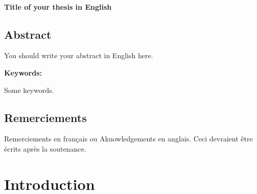 \documentclass[12pt]{LHSV_thesis}
\begin{document}
\begin{center}
~\vspace{6.0cm}\\
\thispagestyle{plain}
\Huge \textbf{Title of your thesis in English}
\vspace*{\fill}
\clearpage
\end{center}

\section*{\Huge Abstract}
%
\vspace{2cm}

You should write your abstract in English here.
\vspace*{28pt}\par
\textbf{Keywords:}\par
Some keywords.
\par
\cleardoublepage

\section*{\Huge Remerciements}
%
\vspace{2cm}

Remerciements en français ou  Aknowledgements en anglais. Ceci devraient être écrits après la soutenance.

\clearpage


\tableofcontents
\clearpage





\chapter*{Introduction}
\label{Introduction}
\end{document}
